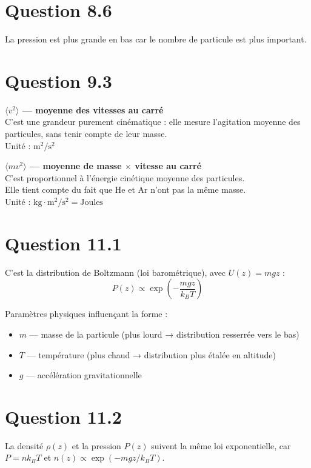 \documentclass[a4paper]{article}
\begin{document}
\section*{Question 8.6}
    La pression est plus grande en bas car le nombre de particule est plus important.

\section*{Question 9.3}
    \textbf{$\langle v^2 \rangle$ — moyenne des vitesses au carré}\\
    C'est une grandeur purement cinématique : elle mesure l'agitation moyenne des particules, sans tenir compte de leur masse.\\
    Unité : $\text{m}^2/\text{s}^2$

    \bigskip

    \textbf{$\langle mv^2 \rangle$ — moyenne de masse $\times$ vitesse au carré}\\

    C'est proportionnel à l'énergie cinétique moyenne des particules.\\
    Elle tient compte du fait que He et Ar n'ont pas la même masse.\\
    Unité : $\text{kg} \cdot \text{m}^2/\text{s}^2 = \text{Joules}$

\section*{Question 11.1}
    C'est la distribution de Boltzmann (loi barométrique), avec $U(z) = mgz$ :
    $$P(z) \propto \exp\!\left(-\frac{mgz}{k_B T}\right)$$

    Paramètres physiques influençant la forme :
    \begin{itemize}
        \item $m$ — masse de la particule (plus lourd → distribution resserrée vers le bas)
        \item $T$ — température (plus chaud → distribution plus étalée en altitude)
        \item $g$ — accélération gravitationnelle
    \end{itemize}

\section*{Question 11.2}
    La densité $\rho(z)$ et la pression $P(z)$ suivent la même loi exponentielle,
    car $P = nk_BT$ et $n(z) \propto \exp(-mgz/k_BT)$.
\end{document}

